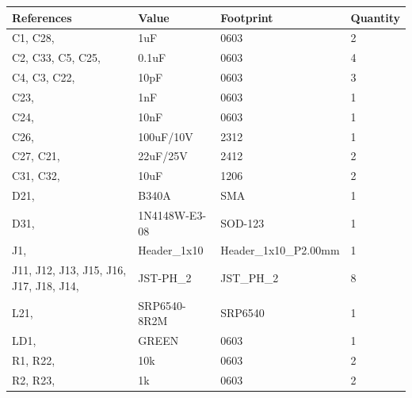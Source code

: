 \documentclass[12pt, a4paper]{article}
\begin{document}
\begin{longtable}{|p{5cm}|p{5cm}|p{5cm}|p{1.7cm}|}
\hline
\textbf{References} & \textbf{Value} & \textbf{Footprint} & \textbf{Quantity}\\ \hline
C1, C28,                                & 1uF                     & 0603                      & 2        \\ \hline
C2, C33, C5, C25,                       & 0.1uF                   & 0603                      & 4        \\ \hline
C4, C3, C22,                            & 10pF                    & 0603                      & 3        \\ \hline
C23,                                    & 1nF                     & 0603                      & 1        \\ \hline
C24,                                    & 10nF                    & 0603                      & 1        \\ \hline
C26,                                    & 100uF/10V               & 2312                      & 1        \\ \hline
C27, C21,                               & 22uF/25V                & 2412                      & 2        \\ \hline
C31, C32,                               & 10uF                    & 1206                      & 2        \\ \hline
D21,                                    & B340A                   & SMA                       & 1        \\ \hline
D31,                                    & 1N4148W-E3-08           & SOD-123                   & 1        \\ \hline
J1,                                     & Header\_1x10            & Header\_1x10\_P2.00mm     & 1        \\ \hline
J11, J12, J13, J15, J16, J17, J18, J14, & JST-PH\_2               & JST\_PH\_2                & 8        \\ \hline
L21,                                    & SRP6540-8R2M            & SRP6540                   & 1        \\ \hline
LD1,                                    & GREEN                   & 0603                      & 1        \\ \hline
R1, R22,                                & 10k                     & 0603                      & 2        \\ \hline
R2, R23,                                & 1k                      & 0603                      & 2        \\ \hline

\end{longtable}
\end{document}
